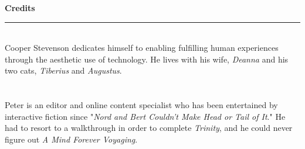 \documentclass[11.75pt,openany,final]{memoir}
\begin{document}
  \BgThispage
  \tableofcontents*
  \noindent\LARGE{\textbf{Credits}}\medbreak
  \hrule
  \smallskip
  \noindent\large{}\\
  \noindent\small{Cooper Stevenson dedicates himself to enabling fulfilling
    human experiences through the aesthetic use of technology. He lives with his
    wife, \emph{Deanna} and his two cats, \emph{Tiberius} and \emph{Augustus}.}\\ \\
  \noindent\large{}\\
  \noindent \small{Peter is an editor and online content
  specialist who has been entertained by interactive fiction since "\emph{Nord and
  Bert Couldn't Make Head or Tail of It}." He had to resort to a walkthrough in
  order to complete \emph{Trinity}, and he could never figure out \emph{A Mind Forever
    Voyaging}.}
\end{document}
